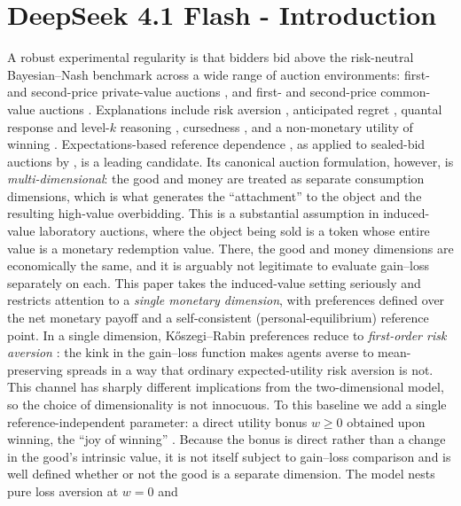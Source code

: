 \documentclass[11pt,a4paper]{article}
\theoremstyle{remark}
\begin{document}
\section{DeepSeek 4.1 Flash - Introduction}
A robust experimental regularity is that bidders bid above the risk-neutral
Bayesian--Nash benchmark across a wide range of auction environments: first- and
second-price private-value auctions \citep{cox1982,coxSmithWalker1988,goeree2002,
crawfordIriberri2007}, and first- and second-price common-value auctions
\citep{kagelLevin1986,eysterRabin2005,crawfordIriberri2007}. Explanations include
risk aversion \citep{cox1982,coxSmithWalker1988}, anticipated regret
\citep{engelbrechtWiggans1989,filizOzbay2007}, quantal response and level-$k$
reasoning \citep{goeree2002,crawfordIriberri2007}, cursedness \citep{eysterRabin2005},
and a non-monetary utility of winning \citep{delgado2008}.
Expectations-based reference dependence \citep{koszegiRabin2006,koszegiRabin2007},
as applied to sealed-bid auctions by \citet{langeRatan2010}, is a leading candidate.
Its canonical auction formulation, however, is \emph{multi-dimensional}: the good
and money are treated as separate consumption dimensions, which is what generates
the ``attachment'' to the object and the resulting high-value overbidding. This is a
substantial assumption in induced-value laboratory auctions, where the object being
sold is a token whose entire value is a monetary redemption value. There, the good
and money dimensions are economically the same, and it is arguably not legitimate to
evaluate gain--loss separately on each.
This paper takes the induced-value setting seriously and restricts attention to a
\emph{single monetary dimension}, with preferences defined over the net monetary
payoff and a self-consistent (personal-equilibrium) reference point. In a single
dimension, K\H{o}szegi--Rabin preferences reduce to \emph{first-order risk aversion}
\citep{koszegiRabin2007}: the kink in the gain--loss function makes agents averse to
mean-preserving spreads in a way that ordinary expected-utility risk aversion is
not. This channel has sharply different implications from the two-dimensional
model, so the choice of dimensionality is not innocuous.
To this baseline we add a single reference-independent parameter: a direct utility
bonus $w\ge0$ obtained upon winning, the ``joy of winning'' \citep{delgado2008}.
Because the bonus is direct rather than a change in the good's intrinsic value, it
is not itself subject to gain--loss comparison and is well defined whether or not
the good is a separate dimension. The model nests pure loss aversion at $w=0$ and
\end{document}
